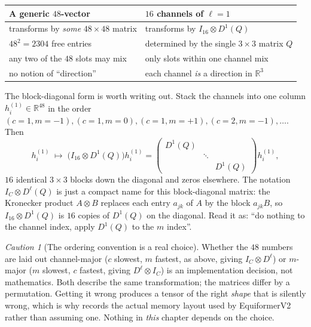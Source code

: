 \documentclass[11pt,a4paper]{report}
\theoremstyle{definition}
\theoremstyle{remark}
\newtheorem{caution}[caution]{Caution}
\newcommand{\RR}{\mathbb R}
\begin{document}
\begin{center}
\begin{tabular}{ll}
\toprule
\textbf{A generic $48$-vector} & \textbf{$16$ channels of $\ell=1$} \\
\midrule
transforms by \emph{some} $48\times48$ matrix & transforms by $I_{16}\otimes D^1(Q)$ \\
$48^2=2304$ free entries & determined by the single $3\times3$ matrix $Q$ \\
any two of the $48$ slots may mix & only slots within one channel mix \\
no notion of ``direction'' & each channel \emph{is} a direction in $\RR^3$ \\
\bottomrule
\end{tabular}
\end{center}

The block-diagonal form is worth writing out. Stack the channels into one
column $h^{(1)}_i\in\RR^{48}$ in the order
$(c=1,m=-1),(c=1,m=0),(c=1,m=+1),(c=2,m=-1),\dots$. Then
\begin{equation}
\label{eq:feature-transform-kron}
h^{(1)}_i \;\longmapsto\; \bigl(I_{16}\otimes D^1(Q)\bigr)h^{(1)}_i
=
\begin{pmatrix}
D^1(Q) & & \\
 & \ddots & \\
 & & D^1(Q)
\end{pmatrix}
h^{(1)}_i ,
\end{equation}
$16$ identical $3\times3$ blocks down the diagonal and zeros elsewhere. The
notation $I_{C}\otimes D^\ell(Q)$ is just a compact name for this
block-diagonal matrix: the Kronecker product $A\otimes B$ replaces each
entry $a_{jk}$ of $A$ by the block $a_{jk}B$, so $I_{16}\otimes D^1(Q)$ is
$16$ copies of $D^1(Q)$ on the diagonal. Read it as: ``do nothing to the
channel index, apply $D^1(Q)$ to the $m$ index''.

\begin{caution}[The ordering convention is a real choice]
\label{caution:feature-ordering}
Whether the $48$ numbers are laid out channel-major
($c$ slowest, $m$ fastest, as above, giving $I_C\otimes D^\ell$) or
$m$-major ($m$ slowest, $c$ fastest, giving $D^\ell\otimes I_C$) is an
implementation decision, not mathematics. Both describe the same
transformation; the matrices differ by a permutation. Getting it wrong
produces a tensor of the right \emph{shape} that is silently wrong, which is
why  records the actual memory layout used by
EquiformerV2 rather than assuming one. Nothing in \emph{this} chapter
depends on the choice.
\end{caution}
\end{document}

